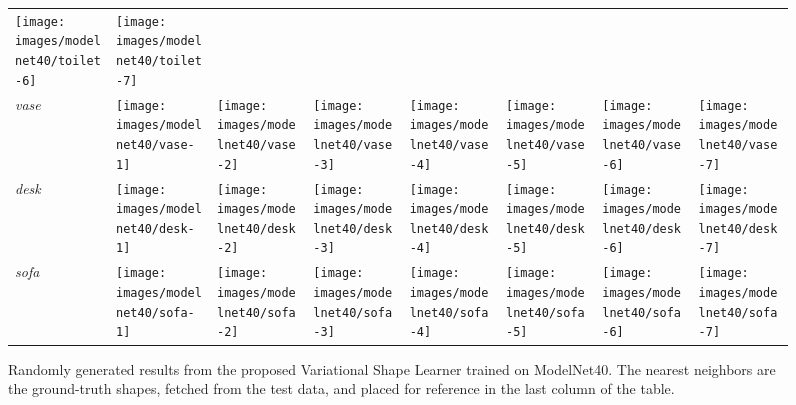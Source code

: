\documentclass[10pt,twocolumn,letterpaper]{article}
\begin{document}
\begin{figure*}[ht!]
\begin{tabular}{C{0.08\textwidth}|m{0.1\textwidth}m{0.1\textwidth}m{0.1\textwidth}m{0.1\textwidth}m{0.1\textwidth}m{0.1\textwidth} | m{0.1\textwidth}}
    \texttt{[image: images/modelnet40/toilet-6]}    &
    \texttt{[image: images/modelnet40/toilet-7]}
    \\
    {\it vase}  &
    \texttt{[image: images/modelnet40/vase-1]}    &
    \texttt{[image: images/modelnet40/vase-2]}    &
     \texttt{[image: images/modelnet40/vase-3]}   &
     \texttt{[image: images/modelnet40/vase-4]}   &
     \texttt{[image: images/modelnet40/vase-5]}   &
     \texttt{[image: images/modelnet40/vase-6]}   &
     \texttt{[image: images/modelnet40/vase-7]}\\
    {\it desk}  &
     \texttt{[image: images/modelnet40/desk-1]}    &
     \texttt{[image: images/modelnet40/desk-2]}    &
     \texttt{[image: images/modelnet40/desk-3]}    &
     \texttt{[image: images/modelnet40/desk-4]}    &
     \texttt{[image: images/modelnet40/desk-5]}    &
     \texttt{[image: images/modelnet40/desk-6]}    &
     \texttt{[image: images/modelnet40/desk-7]}\\
    {\it sofa}  &
    \texttt{[image: images/modelnet40/sofa-1]}   &
    \texttt{[image: images/modelnet40/sofa-2]}   &
    \texttt{[image: images/modelnet40/sofa-3]}   &
    \texttt{[image: images/modelnet40/sofa-4]}   &
    \texttt{[image: images/modelnet40/sofa-5]}   &
    \texttt{[image: images/modelnet40/sofa-6]}  &
    \texttt{[image: images/modelnet40/sofa-7]}
    \end{tabular}
    \caption{Randomly generated results from the proposed Variational Shape Learner trained on ModelNet40. The nearest neighbors are the ground-truth shapes, fetched from the test data, and placed for reference in the last column of the table. }
    \label{fig:shapegen}
\end{figure*}
\end{document}
